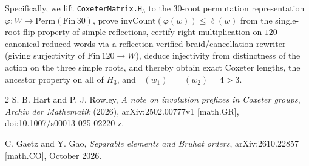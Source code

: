 \documentclass[11pt,a4paper]{article}
\DeclareMathOperator{\ilen}{\ell_{\mathrm{inv}}}
\begin{document}
Specifically, we lift \texttt{CoxeterMatrix.H$_3$} to the $30$-root permutation representation $\varphi : W \to \mathrm{Perm}(\mathrm{Fin}\,30)$, prove $\mathrm{invCount}(\varphi(w)) \le \ell(w)$ from the single-root flip property of simple reflections, certify right multiplication on $120$ canonical reduced words via a reflection-verified braid/cancellation rewriter (giving surjectivity of $\mathrm{Fin}\,120 \to W$), deduce injectivity from distinctness of the action on the three simple roots, and thereby obtain exact Coxeter lengths, the ancestor property on all of $H_3$, and $\ilen(w_1) = \ilen(w_2) = 4 > 3$.

\begin{thebibliography}{2}
S. B. Hart and P. J. Rowley,
\emph{A note on involution prefixes in Coxeter groups},
\emph{Archiv der Mathematik} (2026), arXiv:2502.00777v1 [math.GR], doi:10.1007/s00013-025-02220-z.

C. Gaetz and Y. Gao,
\emph{Separable elements and Bruhat orders},
arXiv:2610.22857 [math.CO], October 2026.
\end{thebibliography}
\end{document}
